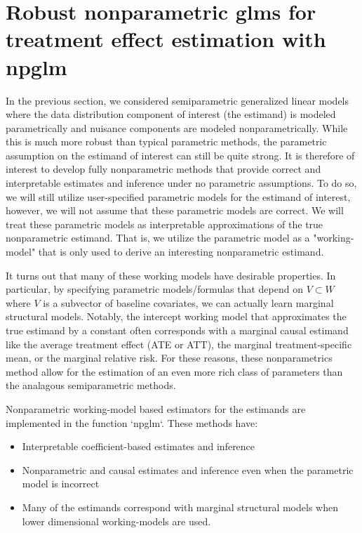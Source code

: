 \documentclass[article]{jss}
\begin{document}
\section{Robust nonparametric glms for treatment effect estimation  with npglm}
In the previous section, we considered semiparametric generalized linear models where the data distribution component of interest (the estimand) is modeled parametrically and nuisance components are modeled nonparametrically. While this is much more robust than typical parametric methods, the parametric assumption on the estimand of interest can still be quite strong. It is therefore of interest to develop fully nonparametric methods that provide correct and interpretable estimates and inference under no parametric assumptions. To do so, we will still utilize user-specified parametric models for the estimand of interest, however, we will not assume that these parametric models are correct. We will treat these parametric models as interpretable approximations of the true nonparametric estimand. That is, we utilize the parametric model as a "working-model" that is only used to derive an interesting nonparametric estimand.

It turns out that many of these working models have desirable properties. In particular, by specifying parametric models/formulas that depend on $V \subset W$ where $V$ is a subvector of baseline covariates, we can actually learn marginal structural models. Notably, the intercept working model that approximates the true estimand by a constant often corresponds with a marginal causal estimand like the average treatment effect (ATE or ATT), the marginal treatment-specific mean, or the marginal relative risk. For these reasons, these nonparametrics method allow for the estimation of an even more rich class of parameters than the analagous semiparametric methods.

Nonparametric working-model based estimators for the estimands are implemented in the function `npglm`. These methods have:

\begin{itemize}
\item Interpretable coefficient-based estimates and inference
\item Nonparametric and causal estimates and inference even when the parametric model is incorrect
\item Many of the estimands correspond with marginal structural models when lower dimensional working-models are used.
\end{itemize}
\end{document}
